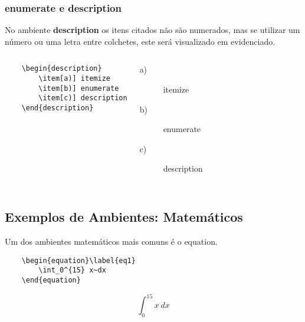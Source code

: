 \subsubsection*{enumerate e description} %
\begin{frame}[fragile]
No ambiente {\bf description} os itens citados não são numerados, 
mas se utilizar um número ou uma letra entre colchetes, este será visualizado em evidenciado.

\begin{columns}
\column[t]{6cm}
\begin{verbatim}
    \begin{description}
        \item[a)] itemize
        \item[b)] enumerate
        \item[c)] description
    \end{description}
\end{verbatim}
\column[t]{6cm}
\begin{description}
\item[a)] itemize
\item[b)] enumerate
\item[c)] description
\end{description}
\end{columns}
\end{frame}


\subsection*{Exemplos de Ambientes: Matemáticos} %

\begin{frame}[fragile]
    Um dos ambientes matemáticos mais comuns é o {\code equation}.

\vspace{0.5cm}
\begin{CenteredBox}
\begin{lstlisting}
    \begin{equation}\label{eq1}
        \int_0^{15} x~dx
    \end{equation}
\end{lstlisting}
\vspace{0.5cm}
\end{CenteredBox}
    \begin{equation}\label{eq1}
        \int_0^{15} x~dx
    \end{equation}
\end{frame}


